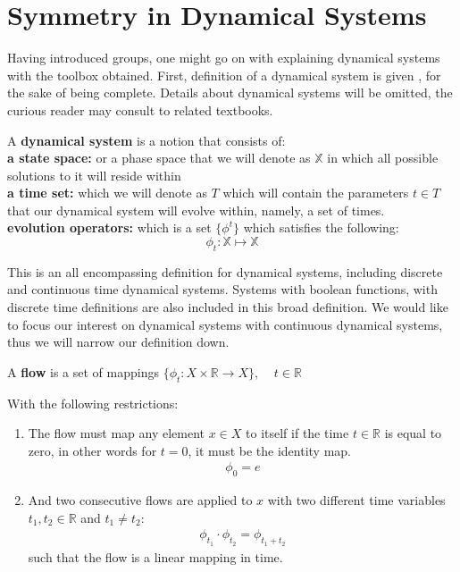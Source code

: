 \chapter{Symmetry in Dynamical Systems}
\thispagestyle{empty}

Having introduced groups, one might go on with explaining dynamical systems with the toolbox obtained. First, definition of a dynamical system is given , for the sake of being complete. Details about dynamical systems will be omitted, the curious reader may consult to related textbooks.

\begin{definition}
\label{def:dynamical_system}

A \textbf{dynamical system} is a notion that consists of:\\

\textbf{a state space:} or a phase space that we will denote as $\mathbb{X}$ in which all possible solutions to it will reside within \\

\textbf{a time set:} which we will denote as $T$ which will contain the parameters $t \in T$ that our dynamical system will evolve within, namely, a set of times. \\

\textbf{evolution operators:} which is a set $\{ \phi^t \}$ which satisfies the following:
\[\phi_t : \mathbb{X} \mapsto \mathbb{X} \] 
\end{definition}

This is an all encompassing definition for dynamical systems, including discrete and continuous time dynamical systems. Systems with boolean functions, with discrete time definitions are also included in this broad definition. We would like to focus our interest on dynamical systems with continuous dynamical systems, thus we will narrow our definition down.

\begin{definition}[Flow]
A \textbf{flow} is a set of mappings $\{ \phi_t : X \times \mathbb{R} \rightarrow X \} ,\;\;\;\;t\in \mathbb{R}$ 
 
With the following restrictions:

\begin{enumerate}
\item The flow must map any element $x\in X$ to itself if the time $t\in \mathbb{R}$ is equal to zero, in other words for $t=0$, it must be the identity map. 
\begin{align}
\phi_{0} = e
\end{align}
\item And two consecutive flows are applied to $x$ with two different time variables $t_1,t_2 \in \mathbb{R}$ and  $t_1 \neq t_2$:
\begin{align}
\phi_{t_1} \cdot \phi_{t_2} = \phi_{t_1+t_2}
\end{align}
such that the flow is a linear mapping in time.

\end{enumerate}
\end{definition}


